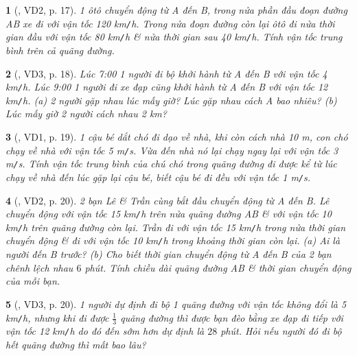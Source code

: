 \documentclass{article}
\newtheorem{baitoan}{}
\begin{document}
\begin{baitoan}[\cite{Van_Quyen_Hanh_Nhu_10_chuyen_Ly}, VD2, p. 17]
	1 ôtô chuyển động từ A đến B, trong nửa phần đầu đoạn đường AB xe đi với vận tốc {\rm120 km{\tt/}h}. Trong nửa đoạn đường còn lại ôtô đi nửa thời gian đầu với vận tốc {\rm80 km{\tt/}h} \& nửa thời gian sau {\rm40 km{\tt/}h}. Tính vận tốc trung bình trên cả quãng đường.
\end{baitoan}

\begin{baitoan}[\cite{Van_Quyen_Hanh_Nhu_10_chuyen_Ly}, VD3, p. 18]
	Lúc {\rm7:00} 1 người đi bộ khởi hành từ A đến B với vận tốc {\rm4 km{\tt/}h}. Lúc {\rm9:00} 1 người đi xe đạp cũng khởi hành từ A đến B với vận tốc {\rm12 km{\tt/}h}. (a) 2 người gặp nhau lúc mấy giờ? Lúc gặp nhau cách A bao nhiêu? (b) Lúc mấy giờ 2 người cách nhau {\rm2 km}?
\end{baitoan}

\begin{baitoan}[\cite{Van_Quyen_Hanh_Nhu_10_chuyen_Ly}, VD1, p. 19]
	1 cậu bé dắt chó đi dạo về nhà, khi còn cách nhà {\rm10 m}, con chó chạy về nhà với vận tốc {\rm5 m{\tt/}s}. Vừa đến nhà nó lại chạy ngay lại với vận tốc {\rm3 m{\tt/}s}. Tính vận tốc trung bình của chú chó trong quãng đường đi được kể từ lúc chạy về nhà đến lúc gặp lại cậu bé, biết cậu bé đi đều với vận tốc {\rm1 m{\tt/}s}.
\end{baitoan}

\begin{baitoan}[\cite{Van_Quyen_Hanh_Nhu_10_chuyen_Ly}, VD2, p. 20]
	2 bạn Lê \& Trần cùng bắt đầu chuyển động từ A đến B. Lê chuyển động với vận tốc {\rm15 km{\tt/}h} trên nửa quãng đường AB \& với vận tốc {\rm10 km{\tt/}h} trên quãng đường còn lại. Trần đi với vận tốc {\rm15 km{\tt/}h} trong nửa thời gian chuyển động \& đi với vận tốc {\rm10 km{\tt/}h} trong khoảng thời gian còn lại. (a) Ai là người đến B trước? (b) Cho biết thời gian chuyển động từ A đến B của 2 bạn chênh lệch nhau $6$ phút. Tính chiều dài quãng đường AB \& thời gian chuyển động của mỗi bạn.
\end{baitoan}

\begin{baitoan}[\cite{Van_Quyen_Hanh_Nhu_10_chuyen_Ly}, VD3, p. 20]
	1 người dự định đi bộ 1 quãng đường với vận tốc không đổi là {\rm5 km{\tt/}h}, nhưng khi đi được $\frac{1}{3}$ quãng đường thì được bạn đèo bằng xe đạp đi tiếp với vận tốc {\rm12 km{\tt/}h} do đó đến sớm hơn dự định là $28$ phút. Hỏi nếu người đó đi bộ hết quãng đường thì mất bao lâu?
\end{baitoan}
\end{document}
